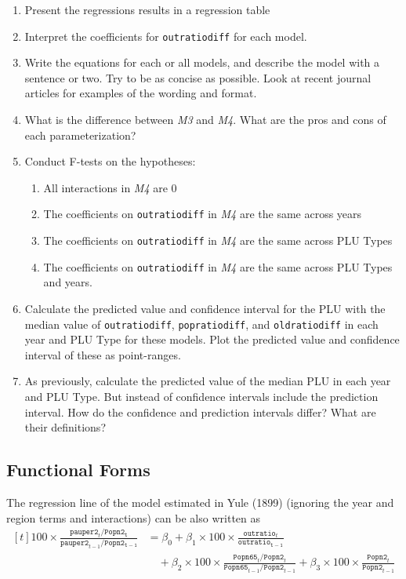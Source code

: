 \documentclass[]{article}
\providecommand{\tightlist}{%
  \setlength{\itemsep}{0pt}\setlength{\parskip}{0pt}}
\begin{document}
\begin{enumerate}
\def\labelenumi{\arabic{enumi}.}
\item
  Present the regressions results in a regression table
\item
  Interpret the coefficients for \texttt{outratiodiff} for each model.
\item
  Write the equations for each or all models, and describe the model
  with a sentence or two. Try to be as concise as possible. Look at
  recent journal articles for examples of the wording and format.
\item
  What is the difference between \emph{M3} and \emph{M4}. What are the
  pros and cons of each parameterization?
\item
  Conduct F-tests on the hypotheses:

  \begin{enumerate}
  \def\labelenumii{\arabic{enumii}.}
  \tightlist
  \item
    All interactions in \emph{M4} are 0
  \item
    The coefficients on \texttt{outratiodiff} in \emph{M4} are the same
    across years
  \item
    The coefficients on \texttt{outratiodiff} in \emph{M4} are the same
    across PLU Types
  \item
    The coefficients on \texttt{outratiodiff} in \emph{M4} are the same
    across PLU Types and years.
  \end{enumerate}
\item
  Calculate the predicted value and confidence interval for the PLU with
  the median value of \texttt{outratiodiff}, \texttt{popratiodiff}, and
  \texttt{oldratiodiff} in each year and PLU Type for these models. Plot
  the predicted value and confidence interval of these as point-ranges.
\item
  As previously, calculate the predicted value of the median PLU in each
  year and PLU Type. But instead of confidence intervals include the
  prediction interval. How do the confidence and prediction intervals
  differ? What are their definitions?
\end{enumerate}

\subsection{Functional Forms}\label{functional-forms}

The regression line of the model estimated in Yule (1899) (ignoring the
year and region terms and interactions) can be also written as \[
\begin{aligned}[t]
100 \times \frac{\mathtt{pauper2}_t / \mathtt{Popn2_t}}{\mathtt{pauper2}_{t-1} / \mathtt{Popn2_{t-1}}} 
&= \beta_0 + \beta_1 \times 100 \times \frac{\mathtt{outratio}_t}{\mathtt{outratio_{t-1}}} \\
& \quad + \beta_2 \times 100 \times \frac{\mathtt{Popn65}_t / \mathtt{Popn2}_{t}}{\mathtt{Popn65}_{t-1} / \mathtt{Popn2}_{t-1}} + \beta_3 \times 100 \times \frac{\mathtt{Popn2}_t}{\mathtt{Popn2}_{t - 1}}
\end{aligned}
\]
\end{document}
